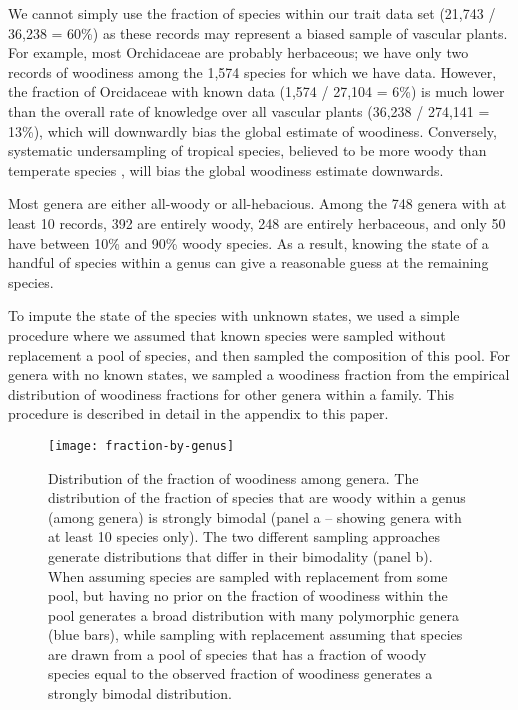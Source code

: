 \documentclass[12pt]{article}
\begin{document}
We cannot simply use the fraction of species within our trait
data set (21,743 / 36,238 = 60\%) as these records may represent a
biased sample of vascular plants.
For example, most Orchidaceae are probably herbaceous; we have only
two records of woodiness among the 1,574 species for which we have
data.
However, the fraction of Orcidaceae with known data (1,574 / 27,104 =
6\%)
is much lower than the overall rate of knowledge over all vascular
plants (36,238 / 274,141 = 13\%), which will downwardly bias the
global estimate of woodiness.
%
Conversely, systematic undersampling of tropical species, believed to
be more woody than temperate species \citep{Molesheihgt}, will bias
the global woodiness estimate downwards.

Most genera are either all-woody or all-hebacious.  Among the 748
genera with at least 10 records, 392 are entirely woody, 248 are
entirely herbaceous, and only 50 have between 10\% and 90\% woody
species.  As a result, knowing the state of a handful of species
within a genus can give a reasonable guess at the remaining species.

To impute the state of the species with unknown states, we used a
simple procedure where we assumed that known species were sampled
without replacement a pool of species, and then sampled the
composition of this pool.  For genera with no known
states, we sampled a woodiness fraction from the empirical
distribution of woodiness fractions for other genera within a family. This procedure is described in detail in the appendix to this paper.

\begin{figure}[p]
  \centering
  \texttt{[image: fraction-by-genus]}
  \caption{Distribution of the fraction of woodiness among genera.
    The distribution of the fraction of species that are woody within
    a genus (among genera) is strongly bimodal (panel a -- showing
    genera with at least 10 species only).
    The two different sampling approaches generate distributions that
    differ in their bimodality (panel b).  When assuming species are
    sampled with replacement from some pool, but having no prior on
    the fraction of woodiness within the pool generates a broad
    distribution with many polymorphic genera (blue bars), while
    sampling with replacement assuming that species are drawn from a
    pool of species that has a fraction of woody species equal to the
    observed fraction of woodiness generates a strongly bimodal
    distribution.}
  \label{fig:distribution-genera}
\end{figure}
\end{document}
